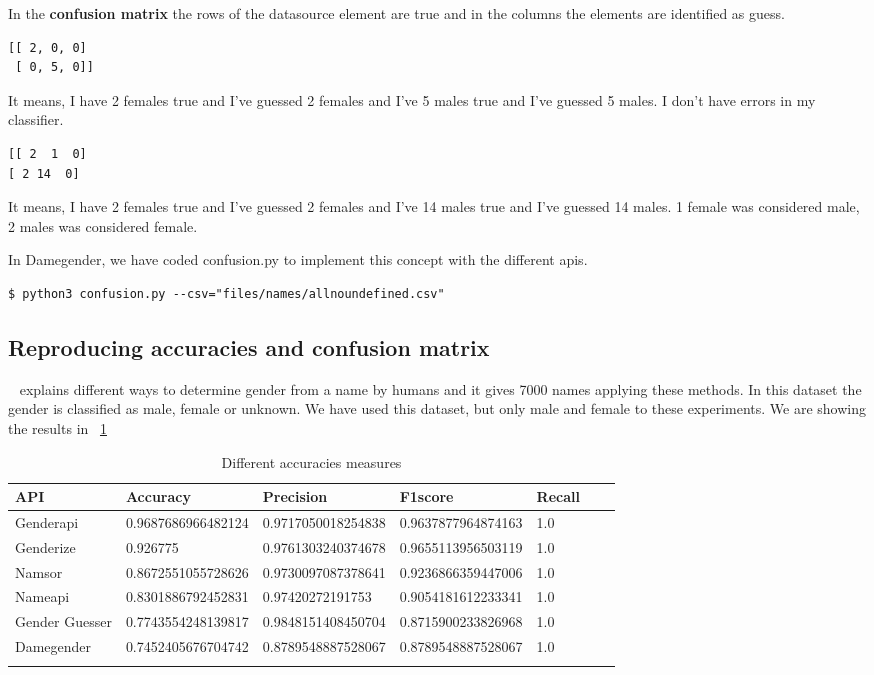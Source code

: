 \documentclass[fleqn,10pt,lineno]{wlpeerj} %
\begin{document}
In the \textbf{confusion matrix} the rows of the datasource element
are true and in the columns the elements are identified as guess.

\begin{verbatim}
[[ 2, 0, 0]
 [ 0, 5, 0]]
\end{verbatim}

It means, I have 2 females true and I've guessed 2 females and I've 5
males true and I've guessed 5 males. I don't have errors in my
classifier.

\begin{verbatim}
[[ 2  1  0]
[ 2 14  0]
\end{verbatim}

It means, I have 2 females true and I've guessed 2 females and I've 14
males true and I've guessed 14 males. 1 female was considered male, 2
males was considered female.

In Damegender, we have coded confusion.py to implement this concept
with the different apis.

\begin{verbatim}
$ python3 confusion.py --csv="files/names/allnoundefined.csv"
\end{verbatim}

\subsection*{Reproducing accuracies and confusion matrix}

~\cite{10.7717/peerj-cs.156} explains different ways to determine
gender from a name by humans and it gives 7000 names applying these
methods. In this dataset the gender is classified as male, female or
unknown. We have used this dataset, but only male and female to these
experiments. We are showing the results in
~\ref{table:DifferentAccuraciesMeasures}

\begin{longtable}[]{@{}lllllll@{}}
  \toprule
  API & Accuracy & Precision & F1score & Recall\tabularnewline
\midrule
\endhead
Genderapi & 0.9687686966482124 & 0.9717050018254838 & 0.9637877964874163 & 1.0\tabularnewline
Genderize & 0.926775 & 0.9761303240374678 & 0.9655113956503119 & 1.0\tabularnewline
Namsor & 0.8672551055728626 & 0.9730097087378641 & 0.9236866359447006 & 1.0\tabularnewline
Nameapi & 0.8301886792452831 & 0.97420272191753 & 0.9054181612233341 & 1.0\tabularnewline
Gender Guesser & 0.7743554248139817 & 0.9848151408450704 & 0.8715900233826968 & 1.0\tabularnewline
Damegender & 0.7452405676704742 & 0.8789548887528067 & 0.8789548887528067 & 1.0\tabularnewline
\bottomrule
\caption{Different accuracies measures}
\label{table:DifferentAccuraciesMeasures}
\end{longtable}
\end{document}
